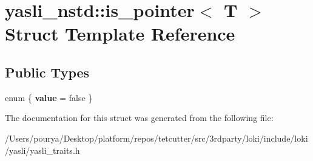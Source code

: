 \hypertarget{structyasli__nstd_1_1is__pointer}{}\section{yasli\+\_\+nstd\+:\+:is\+\_\+pointer$<$ T $>$ Struct Template Reference}
\label{structyasli__nstd_1_1is__pointer}
\subsection*{Public Types}
\begin{DoxyCompactItemize}
\item 
\hypertarget{structyasli__nstd_1_1is__pointer_a86d5b17d06b196f84e1a33af99e5453d}{}enum \{ {\bfseries value} = false
 \}\label{structyasli__nstd_1_1is__pointer_a86d5b17d06b196f84e1a33af99e5453d}

\end{DoxyCompactItemize}


The documentation for this struct was generated from the following file\+:\begin{DoxyCompactItemize}
\item 
/\+Users/pourya/\+Desktop/platform/repos/tetcutter/src/3rdparty/loki/include/loki/yasli/yasli\+\_\+traits.\+h\end{DoxyCompactItemize}
